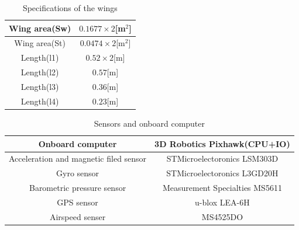 \begin{table}[h]
	\begin{center}
		\caption{Specifications of the wings}
		\label{wingspec}
		\begin{tabular}{|c|c|}\hline
			Wing area(Sw) & $0.1677\times2$[m$^2$]\\ \hline
			Wing area(St) & $0.0474\times2$[m$^2$]\\ \hline
			Length(l1) & $0.52\times2$[m]\\ \hline
			Length(l2) & $0.57$[m]\\ \hline
			Length(l3) & $0.36$[m]\\ \hline
			Length(l4) & $0.23$[m]\\ \hline
		\end{tabular}
	\end{center}
\end{table}
\begin{table}[h]
	\begin{center}
		\caption{Sensors and onboard computer}
		\label{tab:Tab2.2}
		\begin{tabular}{|c|c|} \hline
			Onboard computer & 3D Robotics Pixhawk(CPU+IO)\\ \hline
			Acceleration and magnetic filed sensor & STMicroelectoronics LSM303D\\ \hline
			Gyro sensor & STMicroelectoronics L3GD20H\\ \hline
			Barometric pressure sensor & Measurement Specialties MS5611\\ \hline
			GPS sensor & u-blox LEA-6H\\ \hline
			Airspeed senser & MS4525DO\\ \hline
		\end{tabular}
	\end{center}
\end{table}
